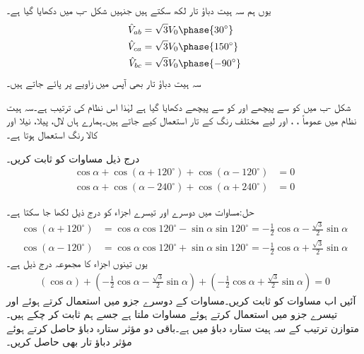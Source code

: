 یوں ہم سہ ہیت دباؤ تار لکھ سکتے ہیں جنہیں شکل -ب میں دکھایا گیا ہے۔
\begin{gather}
\begin{aligned}
\hat{V}_{ab}&=\sqrt{3}V_0\phase{30^{\circ}}\\
\hat{V}_{ca}&=\sqrt{3}V_0\phase{150^{\circ}}\\
\hat{V}_{bc}&=\sqrt{3}V_0\phase{-90^{\circ}}
\end{aligned}
\end{gather}
سہ ہیت دباؤ تار بھی آپس میں  زاویے پر پائے جاتے ہیں۔

شکل -ب میں   کو  سے  پیچھے اور  کو  سے   پیچھے دکھایا گیا ہے لہٰذا اس نظام کی ترتیب  ہے۔سہ ہیت نظام میں عموماً ، ،  اور   لیے مختلف رنگ کے تار استعمال کیے جاتے ہیں۔ہمارے ہاں لال، پیلا، نیلا اور کالا رنگ استعمال ہوتا ہے۔

درج ذیل مساوات کو ثابت کریں۔
\begin{align}
\cos \alpha+\cos(\alpha+120^{\circ})+\cos(\alpha-120^{\circ})&=0\label{مساوات_تین_دوری_تکونی_صفر_برابر_ہے}\\
\cos \alpha+\cos(\alpha-240^{\circ})+\cos(\alpha+240^{\circ})&=0\label{مساوات_تین_دوری_تکونی_صفر_برابر_ب}
\end{align}

حل:مساوات  میں دوسرے اور تیسرے اجزاء کو درج ذیل لکھا جا سکتا ہے۔
\begin{align*}
\cos(\alpha+120^{\circ})&=\cos \alpha \cos 120^{\circ}-\sin \alpha \sin 120^{\circ}=-\frac{1}{2}\cos \alpha-\frac{\sqrt{3}}{2}\sin\alpha\\
\cos(\alpha-120^{\circ})&=\cos \alpha \cos 120^{\circ}+\sin \alpha \sin 120^{\circ}=-\frac{1}{2}\cos \alpha+\frac{\sqrt{3}}{2}\sin\alpha
\end{align*}
یوں تینوں اجزاء کا مجموعہ درج ذیل ہے۔
\begin{align*}
(\cos \alpha)+(-\frac{1}{2}\cos \alpha-\frac{\sqrt{3}}{2}\sin\alpha)+(-\frac{1}{2}\cos \alpha+\frac{\sqrt{3}}{2}\sin\alpha)=0
\end{align*}
آئیں اب مساوات  کو ثابت کریں۔مساوات کے دوسرے جزو میں  استعمال کرتے ہوئے اور تیسرے جزو میں  استعمال کرتے ہوئے مساوات  ملتا ہے جسے ہم ثابت کر چکے ہیں۔
متوازن  ترتیب کے سہ ہیت ستارہ دباؤ  میں  ہے۔باقی دو مؤثر ستارہ دباؤ حاصل کرتے ہوئے مؤثر دباؤ تار بھی حاصل کریں۔

